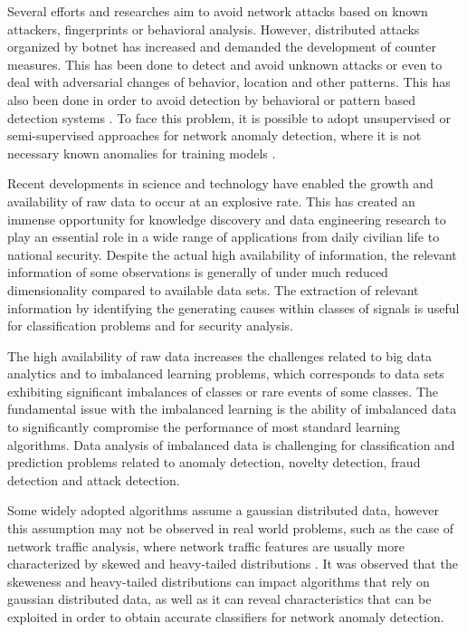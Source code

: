 Several efforts and researches aim to avoid network attacks based on known attackers, fingerprints or behavioral analysis. However, distributed attacks organized by botnet has increased and demanded the development of counter measures. This has been done to detect and avoid unknown attacks or even to deal with adversarial changes of behavior, location and other patterns. This has also been done in order to avoid detection by behavioral or pattern based detection systems \cite{gu2008botminer, garcia2014empirical,khattak2015botflex,acarali2016survey,wang2017botnet,Wang2018ddosbotnetssurvey}. To face this problem, it is possible to adopt unsupervised or semi-supervised approaches for network anomaly detection, where it is not necessary known anomalies for training models \cite{moustafa2019holistic}.

Recent developments in science and technology have enabled the growth and availability of raw data to occur at an explosive rate. This has created an immense opportunity for knowledge discovery and data engineering research to play an essential role in a wide range of applications from daily civilian life to national security. Despite the actual high availability of information, the relevant information of some observations is generally of under much reduced dimensionality compared to available data sets. The extraction of relevant information by identifying the generating causes within classes of signals is useful for classification problems and for security analysis. 

The high availability of raw data increases the challenges related to big data analytics and to imbalanced learning problems, which corresponds to data sets exhibiting significant imbalances of classes or rare events of some classes. The fundamental issue with the imbalanced learning is the ability of imbalanced data to significantly compromise the performance of most standard learning algorithms. Data analysis of imbalanced data is challenging for classification and prediction problems related to anomaly detection, novelty detection, fraud detection and attack detection.

Some widely adopted algorithms assume a gaussian distributed data, however this assumption may not be observed in real world problems, such as the case of network traffic analysis, where network traffic features are usually more characterized by skewed and heavy-tailed distributions \cite{lakhina2005mining,benson2010network,leon2017probability}. It was observed that the skeweness and heavy-tailed distributions can impact algorithms that rely on gaussian distributed data, as well as it can reveal characteristics that can be exploited in order to obtain accurate classifiers for network anomaly detection.

